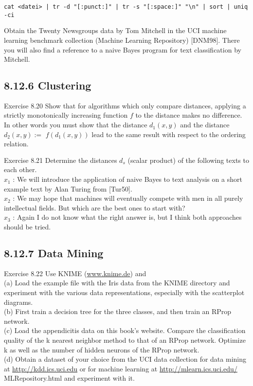 \documentclass[10pt]{article}
\begin{document}
\begin{verbatim}
cat <datei> | tr -d "[:punct:]" | tr -s "[:space:]" "\n" | sort | uniq -ci
\end{verbatim}

Obtain the Twenty Newsgroups data by Tom Mitchell in the UCI machine learning benchmark collection (Machine Learning Repository) [DNM98]. There you will also find a reference to a naive Bayes program for text classification by Mitchell.

\subsection*{8.12.6 Clustering}
Exercise 8.20 Show that for algorithms which only compare distances, applying a strictly monotonically increasing function $f$ to the distance makes no difference. In other words you must show that the distance $d_{1}(x, y)$ and the distance $d_{2}(x, y):=$ $f\left(d_{1}(x, y)\right)$ lead to the same result with respect to the ordering relation.

Exercise 8.21 Determine the distances $d_{s}$ (scalar product) of the following texts to each other.\\
$x_{1}$ : We will introduce the application of naive Bayes to text analysis on a short example text by Alan Turing from [Tur50].\\
$x_{2}$ : We may hope that machines will eventually compete with men in all purely intellectual fields. But which are the best ones to start with?\\
$x_{3}$ : Again I do not know what the right answer is, but I think both approaches should be tried.

\subsection*{8.12.7 Data Mining}
Exercise 8.22 Use KNIME (\href{http://www.knime.de}{www.knime.de}) and\\
(a) Load the example file with the Iris data from the KNIME directory and experiment with the various data representations, especially with the scatterplot diagrams.\\
(b) First train a decision tree for the three classes, and then train an RProp network.\\
(c) Load the appendicitis data on this book's website. Compare the classification quality of the k nearest neighbor method to that of an RProp network. Optimize k as well as the number of hidden neurons of the RProp network.\\
(d) Obtain a dataset of your choice from the UCI data collection for data mining at \href{http://kdd.ics.uci.edu}{http://kdd.ics.uci.edu} or for machine learning at \href{http://mlearn.ics.uci.edu/}{http://mlearn.ics.uci.edu/} MLRepository.html and experiment with it.
\end{document}
